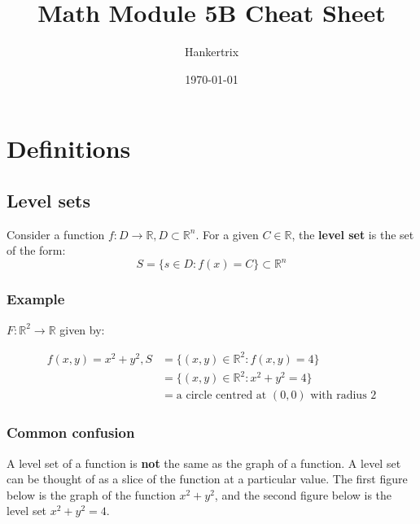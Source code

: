 \documentclass[11pt]{article}
\author{Hankertrix}
\date{\today}
\title{Math Module 5B Cheat Sheet}
\begin{document}
\maketitle
\setcounter{tocdepth}{2}
\tableofcontents \clearpage
\section{Definitions}
\label{sec:org735af8b}

\subsection{Level sets}
\label{sec:org3abad53}
Consider a function \(f : D \rightarrow \mathbb{R}, D \subset \mathbb{R}^n\). For a given \(C \in \mathbb{R}\), the \textbf{level set} is the set of the form:
\[S = \{s \in D : f(x) = C\} \subset \mathbb{R}^n\]

\subsubsection{Example}
\label{sec:org8a8c62d}
\(F: \mathbb{R}^2 \rightarrow \mathbb{R}\) given by:

\begin{align*}
f(x, y) = x^2 + y^2, S &= \{(x, y) \in \mathbb{R}^2 : f(x, y) = 4\} \\
&= \{(x, y) \in \mathbb{R}^2 : x^2 + y^2 = 4\} \\
&= \text{a circle centred at } (0, 0) \text{ with radius } 2
\end{align*}

\newpage

\subsubsection{Common confusion}
\label{sec:org13c493a}
A level set of a function is \textbf{not} the same as the graph of a function. A level set can be thought of as a slice of the function at a particular value. The first figure below is the graph of the function \(x^2 + y^2\), and the second figure below is the level set \(x^2 + y^2 = 4\).
\end{document}
